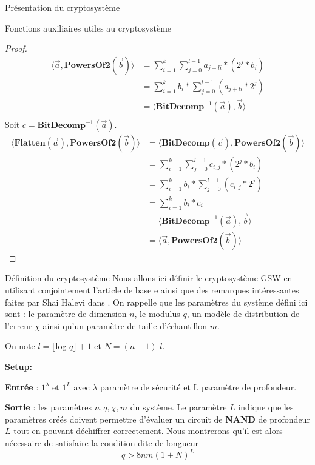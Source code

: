 \begin{section}{Présentation du cryptosystème}
\begin{subsection}{Fonctions auxiliaires utiles au cryptosystème}
	\begin{proof}
	\begin{align*}
	\langle \vec{a}, \textbf{PowersOf2}(\vec{b}) \rangle &= \sum\limits_{i=1}^{k} \sum\limits_{j=0}^{l-1} a_{j+li} * (2^{j} * b_i) \\
	&= \sum\limits_{i=1}^{k} b_i * \sum\limits_{j=0}^{l-1} (a_{j+li} * 2^{j}) \\
	&= \langle \textbf{BitDecomp}^{-1}(\vec{a}), \vec{b}\rangle \\
	\end{align*}
	Soit $c = \textbf{BitDecomp}^{-1}(\vec{a})$.
	\begin{align*}
	\langle \textbf{Flatten}(\vec{a}),\textbf{PowersOf2}(\vec{b}) \rangle &= \langle \textbf{BitDecomp}(\vec{c}),\textbf{PowersOf2}(\vec{b}) \rangle \\
	&= \sum\limits_{i=1}^{k} \sum\limits_{j=0}^{l-1} c_{i,j} * (2^{j} * b_i) \\
	&= \sum\limits_{i=1}^{k} b_i * \sum\limits_{j=0}^{l-1} (c_{i,j} * 2^{j}) \\
	&= \sum\limits_{i=1}^{k} b_i * c_i \\
	&= \langle \textbf{BitDecomp}^{-1}(\vec{a}), \vec{b}\rangle \\
	&= \langle \vec{a}, \textbf{PowersOf2}(\vec{b}) \rangle
	\end{align*}
	\end{proof}
	
	\end{subsection}
	\begin{subsection}{Définition du cryptosystème}
	Nous allons ici définir le cryptosystème GSW en utilisant conjointement l'article de base
	\cite{EPRINT:GenSahWat13}e ainsi que des remarques intéressantes faites par Shai Halevi dans \cite{halevi}.
	On rappelle que les paramètres du système défini ici sont : le paramètre de dimension $n$, le modulus $q$, un
	modèle de distribution de l'erreur $\chi$ ainsi qu'un paramètre de taille d'échantillon $m$.

	On note $l = \lfloor$log $q\rfloor + 1$ et $N = (n + 1)$ $l$.
		


\vspace{0.5cm}\noindent\textbf{Setup:}

	\flushleft

	\textbf{Entrée} : $1^\lambda$ et $1^L$ avec $\lambda$ paramètre de sécurité et L paramètre de profondeur.

	\textbf{Sortie} : les paramètres $n, q, \chi, m$ du système. Le paramètre $L$ indique que les paramètres créés doivent permettre d'évaluer un circuit de \textbf{NAND} de profondeur $L$ tout en pouvant déchiffrer correctement. Nous montrerons qu'il est alors nécessaire de satisfaire la condition dite \og de longueur \fg~  
	\[q > 8nm (1 + N)^L \]


\end{subsection}
\end{section}
